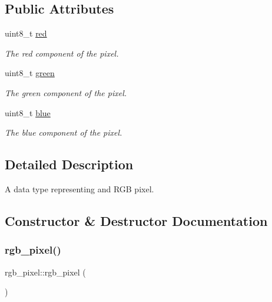 \subsection*{Public Attributes}
\begin{DoxyCompactItemize}
\item 
\mbox{\label{structrgb__pixel_a1f2df0e809c6ae17e69a61ab9bf75a19}} 
uint8\+\_\+t \mbox{\hyperlink{structrgb__pixel_a1f2df0e809c6ae17e69a61ab9bf75a19}{red}}
\begin{DoxyCompactList}\small\item\em The red component of the pixel. \end{DoxyCompactList}\item 
\mbox{\label{structrgb__pixel_a48581a68a54cd5d7c2e9ebffc67c984b}} 
uint8\+\_\+t \mbox{\hyperlink{structrgb__pixel_a48581a68a54cd5d7c2e9ebffc67c984b}{green}}
\begin{DoxyCompactList}\small\item\em The green component of the pixel. \end{DoxyCompactList}\item 
\mbox{\label{structrgb__pixel_aefc328d7500bdd757c22392610e4d3d0}} 
uint8\+\_\+t \mbox{\hyperlink{structrgb__pixel_aefc328d7500bdd757c22392610e4d3d0}{blue}}
\begin{DoxyCompactList}\small\item\em The blue component of the pixel. \end{DoxyCompactList}\end{DoxyCompactItemize}


\subsection{Detailed Description}
A data type representing and R\+GB pixel. 

\subsection{Constructor \& Destructor Documentation}
\mbox{\label{structrgb__pixel_a0acc78a99bc3cac42057cb2d06945124}} 
\subsubsection{\texorpdfstring{rgb\_pixel()}{rgb\_pixel()}\hspace{0.1cm}{\footnotesize\ttfamily [1/2]}}
{\footnotesize\ttfamily rgb\+\_\+pixel\+::rgb\+\_\+pixel (\begin{DoxyParamCaption}{ }\end{DoxyParamCaption})}



